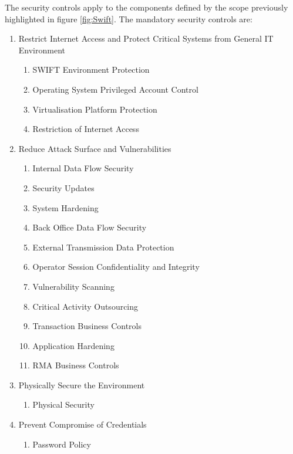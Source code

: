 \documentclass[12pt]{article}
\begin{document}
        The security controls apply to the components defined by the scope previously highlighted in figure \ref{fig:Swift}. The mandatory security controls are:
        \begin{enumerate}
        \item Restrict Internet Access and Protect Critical Systems from General IT Environment
            \begin{enumerate}
                \item SWIFT Environment Protection
                \item Operating System Privileged Account Control
                \item Virtualisation Platform Protection
                \item Restriction of Internet Access
            \end{enumerate}
        \item Reduce Attack Surface and Vulnerabilities
            \begin{enumerate}
                \item Internal Data Flow Security
                \item Security Updates
                \item System Hardening
                \item Back Office Data Flow Security
                \item External Transmission Data Protection
                \item Operator Session Confidentiality and Integrity
                \item Vulnerability Scanning
                \item Critical Activity Outsourcing
                \item Transaction Business Controls
                \item Application Hardening
                \item RMA Business Controls
            \end{enumerate}
        \item Physically Secure the Environment
            \begin{enumerate}
                \item Physical Security
            \end{enumerate}
        \item Prevent Compromise of Credentials
            \begin{enumerate}
                \item Password Policy

\end{enumerate}
\end{enumerate}
\end{document}
